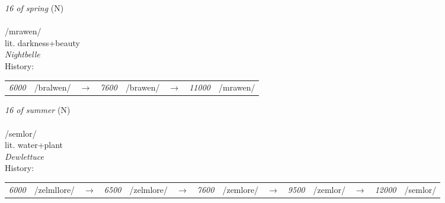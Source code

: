 \vspace{15pt}
\begin{nopagebreak}
 \textit{16 of spring} (N)\\
\\
\noindent /mr{\textprimstress}awen/\\
\noindent lit. darkness+beauty\\
\noindent \textit{Nightbelle}\\


\noindent History:

\vspace{-0pt}
\hspace{40pt}
\begin{tabular}{ccc}
\textit{6000} & /bralwen/&$\rightarrow$ & \textit{7600} & /brawen/&$\rightarrow$ & \textit{11000} & /mrawen/& \\
\end{tabular}

\vspace{20pt}\hline

\end{nopagebreak}
\filbreak



\vspace{15pt}
\begin{nopagebreak}
 \textit{16 of summer} (N)\\
\\
\noindent /s{\textprimstress}emlor/\\
\noindent lit. water+plant\\
\noindent \textit{Dewlettuce}\\


\noindent History:

\vspace{-0pt}
\hspace{40pt}
\begin{tabular}{ccc}
\textit{6000} & /zelmllore/&$\rightarrow$ & \textit{6500} & /zelmlore/&$\rightarrow$ & \textit{7600} & /zemlore/&$\rightarrow$ & \textit{9500} & /zemlor/&$\rightarrow$ & \textit{12000} & /semlor/& \\
\end{tabular}

\vspace{20pt}\hline

\end{nopagebreak}
\filbreak



